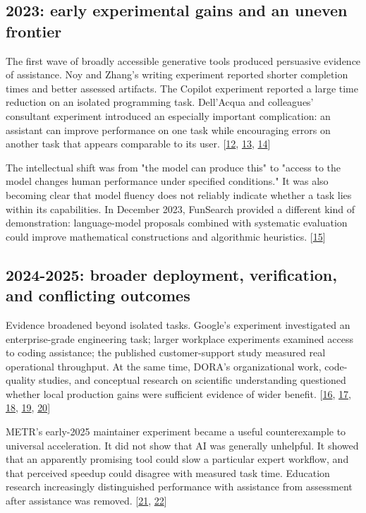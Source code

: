 \subsection*{2023: early experimental gains and an uneven frontier}
The first wave of broadly accessible generative tools produced persuasive evidence of assistance. Noy and Zhang's writing experiment reported shorter completion times and better assessed artifacts. The Copilot experiment reported a large time reduction on an isolated programming task. Dell'Acqua and colleagues' consultant experiment introduced an especially important complication: an assistant can improve performance on one task while encouraging errors on another task that appears comparable to its user. [\hyperlink{ref-noy2023}{12}, \hyperlink{ref-peng2023}{13}, \hyperlink{ref-dellacqua2023}{14}]


The intellectual shift was from "the model can produce this" to "access to the model changes human performance under specified conditions." It was also becoming clear that model fluency does not reliably indicate whether a task lies within its capabilities. In December 2023, FunSearch provided a different kind of demonstration: language-model proposals combined with systematic evaluation could improve mathematical constructions and algorithmic heuristics. [\hyperlink{ref-funsearch2023}{15}]



\subsection*{2024-2025: broader deployment, verification, and conflicting outcomes}
Evidence broadened beyond isolated tasks. Google's experiment investigated an enterprise-grade engineering task; larger workplace experiments examined access to coding assistance; the published customer-support study measured real operational throughput. At the same time, DORA's organizational work, code-quality studies, and conceptual research on scientific understanding questioned whether local production gains were sufficient evidence of wider benefit. [\hyperlink{ref-paradis2024}{16}, \hyperlink{ref-cui2025}{17}, \hyperlink{ref-brynjolfsson2025}{18}, \hyperlink{ref-dora2024}{19}, \hyperlink{ref-messeri2024}{20}]


METR's early-2025 maintainer experiment became a useful counterexample to universal acceleration. It did not show that AI was generally unhelpful. It showed that an apparently promising tool could slow a particular expert workflow, and that perceived speedup could disagree with measured task time. Education research increasingly distinguished performance with assistance from assessment after assistance was removed. [\hyperlink{ref-metr2025}{21}, \hyperlink{ref-bastani2025}{22}]



